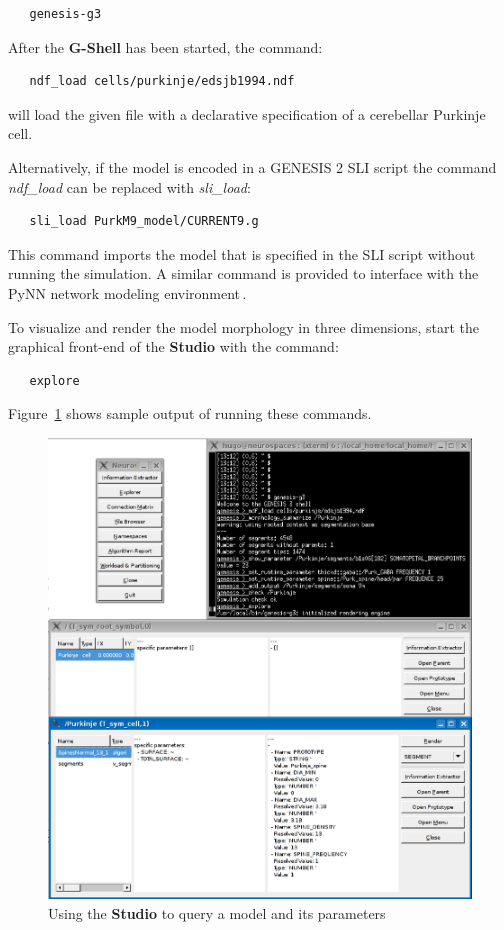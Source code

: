 \documentclass[12pt]{article}
\begin{document}
{\footnotesize
\begin{verbatim}
   genesis-g3
\end{verbatim}
}

After the {\bf G-Shell} has been started, the command:

{\footnotesize
\begin{verbatim}
   ndf_load cells/purkinje/edsjb1994.ndf
\end{verbatim}
}

will load the given file with a declarative specification of a
cerebellar Purkinje cell.

Alternatively, if the model is encoded in a GENESIS 2 SLI script the
command {\it ndf\_load} can be replaced with {\it sli\_load}:

{\footnotesize
\begin{verbatim}
   sli_load PurkM9_model/CURRENT9.g
\end{verbatim}
}

This command imports the model that is specified in the SLI script
without running the simulation.  A similar command is provided to
interface with the PyNN network modeling
environment\,\cite{andrew08:_pynn}.

To visualize and render the model morphology in three dimensions,
start the graphical front-end of the {\bf Studio} with the command:

{\footnotesize
\begin{verbatim}
   explore
\end{verbatim}
}

Figure~\ref{fig:cbi-studio} shows sample output of running these
commands.

\begin{figure}[ht]
  \centering
  \includegraphics[scale=0.3]{figures/studio-screenshot.eps}
  \caption{Using the {\bf Studio} to query a model and its
    parameters}
  \label{fig:cbi-studio}
\end{figure}
\end{document}
